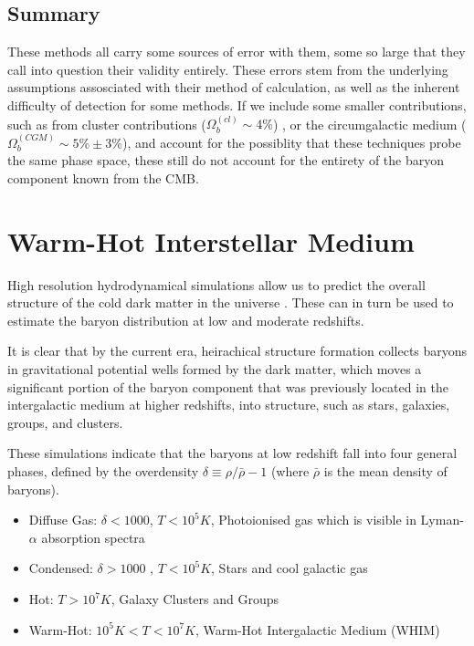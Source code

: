\subsection{Summary}
These methods all carry some sources of error with them, some so large that they call into question their validity entirely. These errors stem from the underlying assumptions assosciated with their method of calculation, as well as the inherent difficulty of detection for some methods. If we include some smaller contributions, such as from cluster contributions ($\Omega_b^{(cl)} \sim 4 \%$)\citep{2004ApJ...616..643F} , or the circumgalactic medium ($\Omega_b^{(CGM)} \sim 5 \% \pm 3\%$), and account for the possiblity that these techniques probe the same phase space, these still do not account for the entirety of the baryon component known from the CMB. 

\section{Warm-Hot Interstellar Medium}
High resolution hydrodynamical simulations allow us to predict the overall structure of the cold dark matter in the universe \citep{1999ApJ...514....1C,2006ApJ...650..560C,2011ApJ...731....6S,2001ApJ...552..473D}. These can in turn be used to estimate the baryon distribution at low and moderate redshifts. 

\par It is clear that by the current era, heirachical structure formation collects baryons in gravitational potential wells formed by the dark matter, which moves a significant portion of the baryon component that was previously located in the intergalactic medium at higher redshifts, into structure, such as stars, galaxies, groups, and clusters. 

\par These simulations indicate that the baryons at low redshift fall into four general phases, defined by the overdensity $\delta \equiv \rho/\bar{\rho} - 1$ (where $\bar{\rho}$ is the mean density of baryons). 

\begin{itemize}
\item Diffuse Gas: $\delta <1000$, $T < 10^5 K$, Photoionised gas which is visible in Lyman-$\alpha$ absorption spectra
\item Condensed: $\delta > 1000$ , $T < 10^5 K$, Stars and cool galactic gas
\item Hot: $T > 10^7 K$, Galaxy Clusters and Groups
\item Warm-Hot: $10^5 K < T <10^7 K $, Warm-Hot Intergalactic Medium (WHIM)
\end{itemize}

